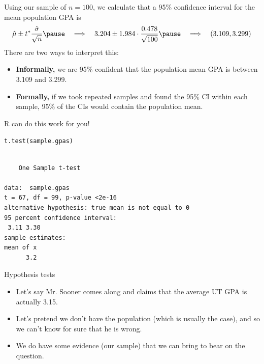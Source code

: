 \documentclass{beamer}\usepackage[]{graphicx}\usepackage[]{color}
\makeatletter
\newcommand{\hlstd}[1]{\textcolor[rgb]{1,0.894,0.769}{#1}}%
\newcommand{\hlkwd}[1]{\textcolor[rgb]{1,0.78,0.769}{#1}}%
\newenvironment{kframe}{%
 \def\at@end@of@kframe{}%
 \ifinner\ifhmode%
  \def\at@end@of@kframe{\end{minipage}}%
  \begin{minipage}{\columnwidth}%
 \fi\fi%
 \def\FrameCommand##1{\hskip\@totalleftmargin \hskip-\fboxsep
 \colorbox{shadecolor}{##1}\hskip-\fboxsep
     \hskip-\linewidth \hskip-\@totalleftmargin \hskip\columnwidth}%
 \MakeFramed {\advance\hsize-\width
   \@totalleftmargin\z@ \linewidth\hsize
   \@setminipage}}%
 {\par\unskip\endMakeFramed%
 \at@end@of@kframe}
\newenvironment{knitrout}{}{} %
\makeatother
\begin{document}
\begin{darkframes}
    \begin{frame}
      Using our sample of $n=100$, we calculate that a 95\% confidence interval for the mean population GPA is
      \[
        \hat\mu \pm t^* \frac{\hat\sigma}{\sqrt n}
        \pause\quad\Longrightarrow\quad
        3.204 \pm 1.984\cdot\frac{0.478}{\sqrt{100}}
        \pause\quad\Longrightarrow\quad
        (3.109, 3.299)
      \]
      \pause
      There are two ways to interpret this:
      \begin{itemize}
        \item \textbf{Informally,} we are 95\% confident that the population mean GPA is between 3.109 and 3.299. \pause
        \item \textbf{Formally,} if we took repeated samples and found the 95\% CI within each sample, 95\% of the CIs would contain the population mean.
      \end{itemize}
    \end{frame}
      
      
    \begin{frame}[fragile]
      R can do this work for you!
\begin{knitrout}
\color{fgcolor}\begin{kframe}
\begin{alltt}
\hlkwd{t.test}\hlstd{(sample.gpas)}
\end{alltt}
\begin{verbatim}

	One Sample t-test

data:  sample.gpas
t = 67, df = 99, p-value <2e-16
alternative hypothesis: true mean is not equal to 0
95 percent confidence interval:
 3.11 3.30
sample estimates:
mean of x 
      3.2 
\end{verbatim}
\end{kframe}
\end{knitrout}
    \end{frame}
      
      
    \begin{frame}{Hypothesis tests}
      \begin{itemize}[<+->]
        \item Let's say Mr. Sooner comes along and claims that the average UT GPA is actually 3.15.
        \item Let's pretend we don't have the population (which is usually the case), and so we can't know for sure that he is wrong.
        \item We do have some evidence (our sample) that we can bring to bear on the question.
      \end{itemize}
    \end{frame}


\end{darkframes}
\end{document}
